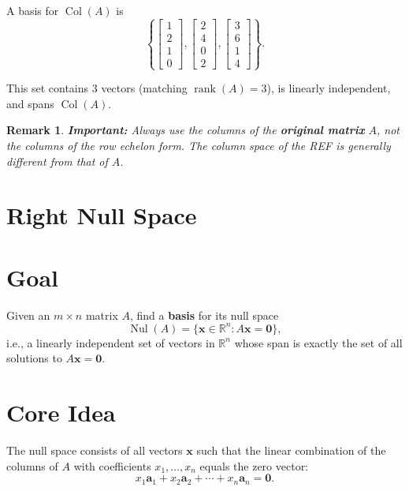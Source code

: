\documentclass{article}
\newtheorem{remark}{Remark}
\begin{document}
A basis for $\operatorname{Col}(A)$ is
\[
\boxed{
\left\{
\begin{bmatrix} 1 \\ 2 \\ 1 \\ 0 \end{bmatrix},
\begin{bmatrix} 2 \\ 4 \\ 0 \\ 2 \end{bmatrix},
\begin{bmatrix} 3 \\ 6 \\ 1 \\ 4 \end{bmatrix}
\right\}
}.
\]

This set contains $3$ vectors (matching $\operatorname{rank}(A) = 3$), is linearly independent, and spans $\operatorname{Col}(A)$.

\begin{remark}
\textbf{Important:} Always use the columns of the \textbf{original matrix} $A$, \textit{not} the columns of the row echelon form. The column space of the REF is generally different from that of $A$.
\end{remark}

\section*{Right Null Space}

\section*{Goal}
Given an $m \times n$ matrix $A$, find a \textbf{basis} for its null space
\[
\operatorname{Nul}(A) = \{ \mathbf{x} \in \mathbb{R}^n : A\mathbf{x} = \mathbf{0} \},
\]
i.e., a linearly independent set of vectors in $\mathbb{R}^n$ whose span is exactly the set of all solutions to $A\mathbf{x} = \mathbf{0}$.

\section*{Core Idea}

The null space consists of all vectors $\mathbf{x}$ such that the linear combination of the columns of $A$ with coefficients $x_1, \dots, x_n$ equals the zero vector:
\[
x_1 \mathbf{a}_1 + x_2 \mathbf{a}_2 + \cdots + x_n \mathbf{a}_n = \mathbf{0}.
\]
\end{document}
